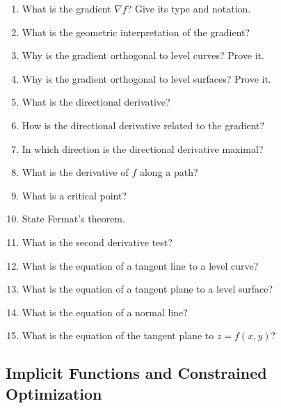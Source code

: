 \begin{enumerate}[resume]
  \item What is the gradient $\nabla f$? Give its type and notation.
  \item What is the geometric interpretation of the gradient?
  \item Why is the gradient orthogonal to level curves? Prove it.
  \item Why is the gradient orthogonal to level surfaces? Prove it.
  \item What is the directional derivative?
  \item How is the directional derivative related to the gradient?
  \item In which direction is the directional derivative maximal?
  \item What is the derivative of $f$ along a path?
  \item What is a critical point?
  \item State Fermat's theorem.
  \item What is the second derivative test?
  \item What is the equation of a tangent line to a level curve?
  \item What is the equation of a tangent plane to a level surface?
  \item What is the equation of a normal line?
  \item What is the equation of the tangent plane to $z=f(x,y)$?
\end{enumerate}

\subsection{Implicit Functions and Constrained Optimization}

